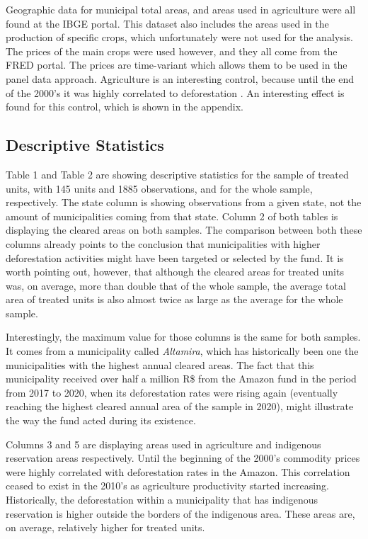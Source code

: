 \documentclass[11pt, oneside]{article}   	%
\begin{document}
Geographic data for municipal total areas, and areas used in agriculture were all found at the IBGE portal. This dataset also includes the areas used in the production of specific crops, which unfortunately were not used for the analysis. The prices of the main crops were used however, and they all come from the FRED portal. The prices are time-variant which allows them to be used in the panel data approach. Agriculture is an interesting control, because until the end of the 2000's it was highly correlated to deforestation \cite{assunccao2015deforestation}. An interesting effect is found for this control, which is shown in the appendix.

\subsection{Descriptive Statistics}

Table 1 and Table 2 are showing descriptive statistics for the sample of treated units, with 145 units and 1885 observations, and for the whole sample, respectively. The state column is showing observations from a given state, not the amount of municipalities coming from that state. 
Column 2 of both tables is displaying the cleared areas on both samples. The comparison between both these columns already points to the conclusion that municipalities with higher deforestation activities might have been targeted or selected by the fund. It is worth pointing out, however, that although the cleared areas for treated units was, on average, more than  double that of the whole sample, the average total area of treated units is also almost twice as large as the average for the whole sample. 

Interestingly, the maximum value for those columns is the same for both samples. It comes from a municipality called \textit{Altamira}, which has historically been one the municipalities with the highest annual cleared areas. The fact that this municipality received over half a million R\$ from the Amazon fund in the period from 2017 to 2020, when its deforestation rates were rising again (eventually reaching the highest cleared annual area of the sample in 2020), might illustrate the way the fund acted during its existence. 

Columns 3 and 5 are displaying areas used in agriculture and indigenous reservation areas respectively. Until the beginning of the 2000's commodity prices were highly correlated with deforestation rates in the Amazon. This correlation ceased to exist in the 2010's as agriculture productivity started increasing. Historically, the deforestation within a municipality that has indigenous reservation is higher outside the borders of the indigenous area. These areas are, on average, relatively higher for treated units. 
\end{document}
